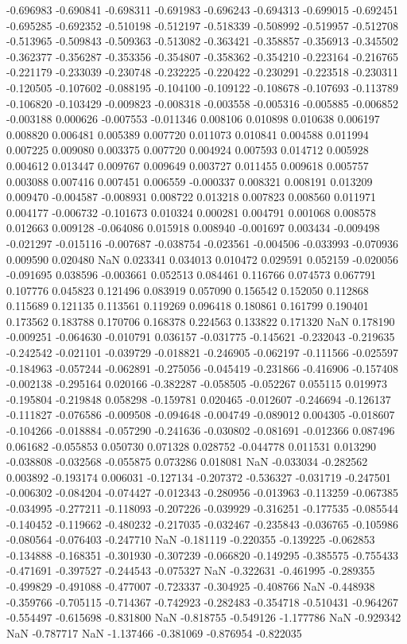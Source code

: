 -0.696983
-0.690841
-0.698311
-0.691983
-0.696243
-0.694313
-0.699015
-0.692451
-0.695285
-0.692352
-0.510198
-0.512197
-0.518339
-0.508992
-0.519957
-0.512708
-0.513965
-0.509843
-0.509363
-0.513082
-0.363421
-0.358857
-0.356913
-0.345502
-0.362377
-0.356287
-0.353356
-0.354807
-0.358362
-0.354210
-0.223164
-0.216765
-0.221179
-0.233039
-0.230748
-0.232225
-0.220422
-0.230291
-0.223518
-0.230311
-0.120505
-0.107602
-0.088195
-0.104100
-0.109122
-0.108678
-0.107693
-0.113789
-0.106820
-0.103429
-0.009823
-0.008318
-0.003558
-0.005316
-0.005885
-0.006852
-0.003188
0.000626
-0.007553
-0.011346
0.008106
0.010898
0.010638
0.006197
0.008820
0.006481
0.005389
0.007720
0.011073
0.010841
0.004588
0.011994
0.007225
0.009080
0.003375
0.007720
0.004924
0.007593
0.014712
0.005928
0.004612
0.013447
0.009767
0.009649
0.003727
0.011455
0.009618
0.005757
0.003088
0.007416
0.007451
0.006559
-0.000337
0.008321
0.008191
0.013209
0.009470
-0.004587
-0.008931
0.008722
0.013218
0.007823
0.008560
0.011971
0.004177
-0.006732
-0.101673
0.010324
0.000281
0.004791
0.001068
0.008578
0.012663
0.009128
-0.064086
0.015918
0.008940
-0.001697
0.003434
-0.009498
-0.021297
-0.015116
-0.007687
-0.038754
-0.023561
-0.004506
-0.033993
-0.070936
0.009590
0.020480
NaN
0.023341
0.034013
0.010472
0.029591
0.052159
-0.020056
-0.091695
0.038596
-0.003661
0.052513
0.084461
0.116766
0.074573
0.067791
0.107776
0.045823
0.121496
0.083919
0.057090
0.156542
0.152050
0.112868
0.115689
0.121135
0.113561
0.119269
0.096418
0.180861
0.161799
0.190401
0.173562
0.183788
0.170706
0.168378
0.224563
0.133822
0.171320
NaN
0.178190
-0.009251
-0.064630
-0.010791
0.036157
-0.031775
-0.145621
-0.232043
-0.219635
-0.242542
-0.021101
-0.039729
-0.018821
-0.246905
-0.062197
-0.111566
-0.025597
-0.184963
-0.057244
-0.062891
-0.275056
-0.045419
-0.231866
-0.416906
-0.157408
-0.002138
-0.295164
0.020166
-0.382287
-0.058505
-0.052267
0.055115
0.019973
-0.195804
-0.219848
0.058298
-0.159781
0.020465
-0.012607
-0.246694
-0.126137
-0.111827
-0.076586
-0.009508
-0.094648
-0.004749
-0.089012
0.004305
-0.018607
-0.104266
-0.018884
-0.057290
-0.241636
-0.030802
-0.081691
-0.012366
0.087496
0.061682
-0.055853
0.050730
0.071328
0.028752
-0.044778
0.011531
0.013290
-0.038808
-0.032568
-0.055875
0.073286
0.018081
NaN
-0.033034
-0.282562
0.003892
-0.193174
0.006031
-0.127134
-0.207372
-0.536327
-0.031719
-0.247501
-0.006302
-0.084204
-0.074427
-0.012343
-0.280956
-0.013963
-0.113259
-0.067385
-0.034995
-0.277211
-0.118093
-0.207226
-0.039929
-0.316251
-0.177535
-0.085544
-0.140452
-0.119662
-0.480232
-0.217035
-0.032467
-0.235843
-0.036765
-0.105986
-0.080564
-0.076403
-0.247710
NaN
-0.181119
-0.220355
-0.139225
-0.062853
-0.134888
-0.168351
-0.301930
-0.307239
-0.066820
-0.149295
-0.385575
-0.755433
-0.471691
-0.397527
-0.244543
-0.075327
NaN
-0.322631
-0.461995
-0.289355
-0.499829
-0.491088
-0.477007
-0.723337
-0.304925
-0.408766
NaN
-0.448938
-0.359766
-0.705115
-0.714367
-0.742923
-0.282483
-0.354718
-0.510431
-0.964267
-0.554497
-0.615698
-0.831800
NaN
-0.818755
-0.549126
-1.177786
NaN
-0.929342
NaN
-0.787717
NaN
-1.137466
-0.381069
-0.876954
-0.822035
